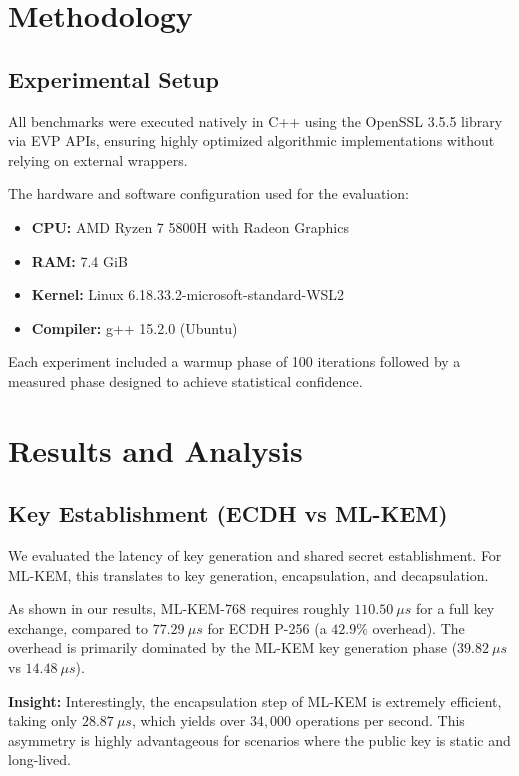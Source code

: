 \documentclass[10pt, conference]{IEEEtran}
\begin{document}
\section{Methodology}
\subsection{Experimental Setup}
All benchmarks were executed natively in C++ using the OpenSSL 3.5.5 library via EVP APIs, ensuring highly optimized algorithmic implementations without relying on external wrappers.

The hardware and software configuration used for the evaluation:
\begin{itemize}
    \item \textbf{CPU:} AMD Ryzen 7 5800H with Radeon Graphics
    \item \textbf{RAM:} 7.4 GiB
    \item \textbf{Kernel:} Linux 6.18.33.2-microsoft-standard-WSL2
    \item \textbf{Compiler:} g++ 15.2.0 (Ubuntu)
\end{itemize}

Each experiment included a warmup phase of 100 iterations followed by a measured phase designed to achieve statistical confidence. 

\section{Results and Analysis}

\subsection{Key Establishment (ECDH vs ML-KEM)}
We evaluated the latency of key generation and shared secret establishment. For ML-KEM, this translates to key generation, encapsulation, and decapsulation.

As shown in our results, ML-KEM-768 requires roughly $110.50~\mu s$ for a full key exchange, compared to $77.29~\mu s$ for ECDH P-256 (a $42.9\%$ overhead). The overhead is primarily dominated by the ML-KEM key generation phase ($39.82~\mu s$ vs $14.48~\mu s$).

\textbf{Insight:} Interestingly, the encapsulation step of ML-KEM is extremely efficient, taking only $28.87~\mu s$, which yields over $34,000$ operations per second. This asymmetry is highly advantageous for scenarios where the public key is static and long-lived.
\end{document}
